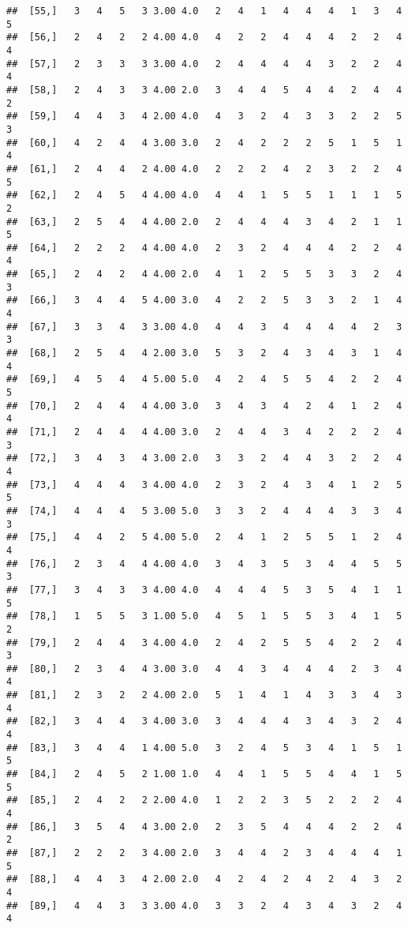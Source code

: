 \documentclass[]{article}
\begin{document}
\begin{verbatim}
##  [55,]   3   4   5   3 3.00 4.0   2   4   1   4   4   4   1   3   4   5
##  [56,]   2   4   2   2 4.00 4.0   4   2   2   4   4   4   2   2   4   4
##  [57,]   2   3   3   3 3.00 4.0   2   4   4   4   4   3   2   2   4   4
##  [58,]   2   4   3   3 4.00 2.0   3   4   4   5   4   4   2   4   4   2
##  [59,]   4   4   3   4 2.00 4.0   4   3   2   4   3   3   2   2   5   3
##  [60,]   4   2   4   4 3.00 3.0   2   4   2   2   2   5   1   5   1   4
##  [61,]   2   4   4   2 4.00 4.0   2   2   2   4   2   3   2   2   4   5
##  [62,]   2   4   5   4 4.00 4.0   4   4   1   5   5   1   1   1   5   2
##  [63,]   2   5   4   4 4.00 2.0   2   4   4   4   3   4   2   1   1   5
##  [64,]   2   2   2   4 4.00 4.0   2   3   2   4   4   4   2   2   4   4
##  [65,]   2   4   2   4 4.00 2.0   4   1   2   5   5   3   3   2   4   3
##  [66,]   3   4   4   5 4.00 3.0   4   2   2   5   3   3   2   1   4   4
##  [67,]   3   3   4   3 3.00 4.0   4   4   3   4   4   4   4   2   3   3
##  [68,]   2   5   4   4 2.00 3.0   5   3   2   4   3   4   3   1   4   4
##  [69,]   4   5   4   4 5.00 5.0   4   2   4   5   5   4   2   2   4   5
##  [70,]   2   4   4   4 4.00 3.0   3   4   3   4   2   4   1   2   4   4
##  [71,]   2   4   4   4 4.00 3.0   2   4   4   3   4   2   2   2   4   3
##  [72,]   3   4   3   4 3.00 2.0   3   3   2   4   4   3   2   2   4   4
##  [73,]   4   4   4   3 4.00 4.0   2   3   2   4   3   4   1   2   5   5
##  [74,]   4   4   4   5 3.00 5.0   3   3   2   4   4   4   3   3   4   3
##  [75,]   4   4   2   5 4.00 5.0   2   4   1   2   5   5   1   2   4   4
##  [76,]   2   3   4   4 4.00 4.0   3   4   3   5   3   4   4   5   5   3
##  [77,]   3   4   3   3 4.00 4.0   4   4   4   5   3   5   4   1   1   5
##  [78,]   1   5   5   3 1.00 5.0   4   5   1   5   5   3   4   1   5   2
##  [79,]   2   4   4   3 4.00 4.0   2   4   2   5   5   4   2   2   4   3
##  [80,]   2   3   4   4 3.00 3.0   4   4   3   4   4   4   2   3   4   4
##  [81,]   2   3   2   2 4.00 2.0   5   1   4   1   4   3   3   4   3   4
##  [82,]   3   4   4   3 4.00 3.0   3   4   4   4   3   4   3   2   4   4
##  [83,]   3   4   4   1 4.00 5.0   3   2   4   5   3   4   1   5   1   5
##  [84,]   2   4   5   2 1.00 1.0   4   4   1   5   5   4   4   1   5   5
##  [85,]   2   4   2   2 2.00 4.0   1   2   2   3   5   2   2   2   4   4
##  [86,]   3   5   4   4 3.00 2.0   2   3   5   4   4   4   2   2   4   2
##  [87,]   2   2   2   3 4.00 2.0   3   4   4   2   3   4   4   4   1   5
##  [88,]   4   4   3   4 2.00 2.0   4   2   4   2   4   2   4   3   2   4
##  [89,]   4   4   3   3 3.00 4.0   3   3   2   4   3   4   3   2   4   4

\end{verbatim}
\end{document}
